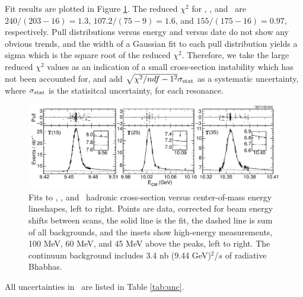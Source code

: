 \documentclass[aps,prl,twocolumn,superscriptaddress,showpacs]{revtex4}
\begin{document}
Fit results are plotted in Figure \ref{fig:fits}.  The reduced
$\chi^2$ for \us, \uss, and \usss\ are $240/(203-16) = 1.3$,
$107.2/(75-9) = 1.6$, and $155/(175-16) = 0.97$, respectively.  Pull
distributions versus energy and versus date do not show any obvious
trends, and the width of a Gaussian fit to each pull distribution
yields a sigma which is the square root of the reduced $\chi^2$.
Therefore, we take the large reduced $\chi^2$ values as an indication
of a small cross-section instability which has not been accounted for,
and add $\sqrt{\chi^2/ndf - 1^2} \sigma_{\mbox{\scriptsize stat}}$ as
a systematic uncertainty, where $\sigma_{\mbox{\scriptsize stat}}$ is
the statisitcal uncertainty, for each resonance.

\begin{figure}
  \includegraphics[width=\linewidth]{fits}
  \caption{\label{fig:fits} Fits to \us, \uss, and \usss\ hadronic
  cross-section versus center-of-mass energy lineshapes, left to
  right.  Points are data, corrected for beam energy shifts between
  scans, the solid line is the fit, the dashed line is sum of all
  backgrounds, and the insets show high-energy measurements, 100 MeV,
  60 MeV, and 45 MeV above the peaks, left to right.  The continuum
  background includes 3.4 nb (9.44 GeV)$^2$/$s$ of radiative Bhabhas.}
\end{figure}

All uncertainties in \gee\ are listed in Table \ref{tab:unc}.
\end{document}
